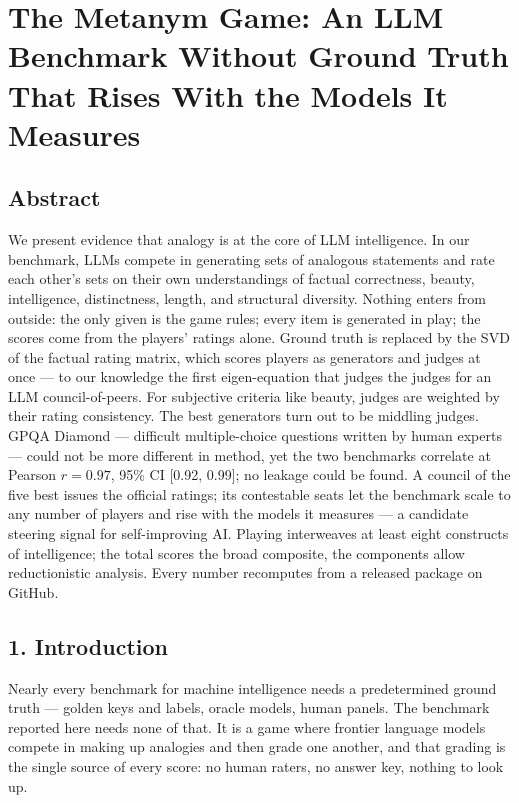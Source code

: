 \section{The Metanym Game: An LLM Benchmark Without Ground Truth That Rises With the Models It Measures}\label{the-metanym-game-an-llm-benchmark-without-ground-truth-that-rises-with-the-models-it-measures}

\subsection{Abstract}\label{abstract}

We present evidence that analogy is at the core of LLM intelligence. In our benchmark, LLMs compete in generating sets of analogous statements and rate each other's sets on their own understandings of factual correctness, beauty, intelligence, distinctness, length, and structural diversity. Nothing enters from outside: the only given is the game rules; every item is generated in play; the scores come from the players' ratings alone. Ground truth is replaced by the SVD of the factual rating matrix, which scores players as generators and judges at once --- to our knowledge the first eigen-equation that judges the judges for an LLM council-of-peers. For subjective criteria like beauty, judges are weighted by their rating consistency. The best generators turn out to be middling judges. GPQA Diamond --- difficult multiple-choice questions written by human experts --- could not be more different in method, yet the two benchmarks correlate at Pearson \(r = 0.97\), 95\% CI {[}0.92, 0.99{]}; no leakage could be found. A council of the five best issues the official ratings; its contestable seats let the benchmark scale to any number of players and rise with the models it measures --- a candidate steering signal for self-improving AI. Playing interweaves at least eight constructs of intelligence; the total scores the broad composite, the components allow reductionistic analysis. Every number recomputes from a released package on GitHub.

\subsection{1. Introduction}\label{introduction}

Nearly every benchmark for machine intelligence needs a predetermined ground truth --- golden keys and labels, oracle models, human panels. The benchmark reported here needs none of that. It is a game where frontier language models compete in making up analogies and then grade one another, and that grading is the single source of every score: no human raters, no answer key, nothing to look up.


